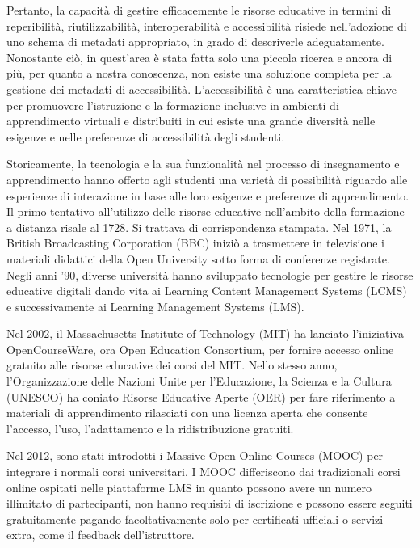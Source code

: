 Pertanto, la capacità di gestire efficacemente le risorse educative in termini di reperibilità, riutilizzabilità, interoperabilità e accessibilità risiede nell'adozione di uno schema di metadati appropriato, in grado di descriverle adeguatamente. Nonostante ciò, in quest'area è stata fatta solo una piccola ricerca e ancora di più, per quanto a nostra conoscenza, non esiste una soluzione completa per la gestione dei metadati di accessibilità. L'accessibilità è una caratteristica chiave per promuovere l'istruzione e la formazione inclusive in ambienti di apprendimento virtuali e distribuiti in cui esiste una grande diversità nelle esigenze e nelle preferenze di accessibilità degli studenti.

Storicamente, la tecnologia e la sua funzionalità nel processo di insegnamento e apprendimento hanno offerto agli studenti una varietà di possibilità riguardo alle esperienze di interazione in base alle loro esigenze e preferenze di apprendimento. Il primo tentativo all'utilizzo delle risorse educative nell'ambito della formazione a distanza risale al 1728. Si trattava di corrispondenza stampata. Nel 1971, la British Broadcasting Corporation (BBC) iniziò a trasmettere in televisione i materiali didattici della Open University sotto forma di conferenze registrate. Negli anni '90, diverse università hanno sviluppato tecnologie per gestire le risorse educative digitali dando vita ai Learning Content Management Systems (LCMS) e successivamente ai Learning Management Systems (LMS).

Nel 2002, il Massachusetts Institute of Technology (MIT) ha lanciato l'iniziativa OpenCourseWare, ora Open Education Consortium, per fornire accesso online gratuito alle risorse educative dei corsi del MIT. Nello stesso anno, l'Organizzazione delle Nazioni Unite per l'Educazione, la Scienza e la Cultura (UNESCO) ha coniato Risorse Educative Aperte (OER) per fare riferimento a materiali di apprendimento rilasciati con una licenza aperta che consente l'accesso, l'uso, l'adattamento e la ridistribuzione gratuiti.

Nel 2012, sono stati introdotti i Massive Open Online Courses (MOOC) per integrare i normali corsi universitari. I MOOC differiscono dai tradizionali corsi online ospitati nelle piattaforme LMS in quanto possono avere un numero illimitato di partecipanti, non hanno requisiti di iscrizione e possono essere seguiti gratuitamente pagando facoltativamente solo per certificati ufficiali o servizi extra, come il feedback dell'istruttore.

